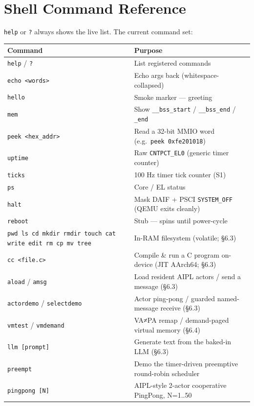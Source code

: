 \documentclass[a4paper,11pt]{article}
\begin{document}
\section{Shell Command Reference}
\verb|help| or \verb|?| always shows the live list. The current command set:
\begin{center}\footnotesize
\begin{longtable}{@{}l p{9.0cm}@{}}
\toprule
\textbf{Command} & \textbf{Purpose}\\
\midrule \endhead
\verb|help| / \verb|?|    & List registered commands\\
\verb|echo <words>|       & Echo args back (whitespace-collapsed)\\
\verb|hello|              & Smoke marker --- greeting\\
\verb|mem|                & Show \verb|__bss_start| / \verb|__bss_end| / \verb|_end|\\
\verb|peek <hex_addr>|    & Read a 32-bit MMIO word (e.g.\ \verb|peek 0xfe201018|)\\
\verb|uptime|            & Raw \verb|CNTPCT_EL0| (generic timer counter)\\
\verb|ticks|             & 100 Hz timer tick counter (S1)\\
\verb|ps|                & Core / EL status\\
\verb|halt|              & Mask DAIF + PSCI \verb|SYSTEM_OFF| (QEMU exits cleanly)\\
\verb|reboot|            & Stub --- spins until power-cycle\\
\verb|pwd ls cd mkdir rmdir touch cat write edit rm cp mv tree| & In-RAM filesystem (volatile; §6.3)\\
\verb|cc <file.c>|        & Compile \& run a C program on-device (JIT \textrightarrow{} AArch64; §6.3)\\
\verb|aload| / \verb|amsg| & Load resident AIPL actors / send a message (§6.3)\\
\verb|actordemo| / \verb|selectdemo| & Actor ping-pong / guarded named-message receive (§6.3)\\
\verb|vmtest| / \verb|vmdemand| & VA≠PA remap / demand-paged virtual memory (§6.4)\\
\verb|llm [prompt]|       & Generate text from the baked-in LLM (§6.3)\\
\verb|preempt|           & Demo the timer-driven preemptive round-robin scheduler\\
\verb|pingpong [N]|       & AIPL-style 2-actor cooperative PingPong, N=1..50\\

\end{longtable}
\end{center}
\end{document}
